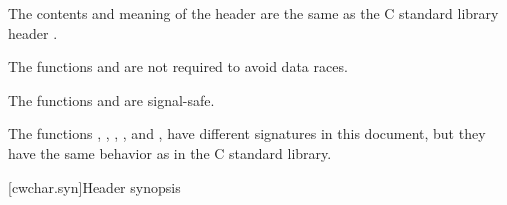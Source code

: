 \pnum
{}%
The contents and meaning of the header 
are the same as the C standard library header .

\pnum
The functions  and  are not required to avoid data
races.

\pnum
{}%
%
The functions  and  are signal-safe.

\pnum
\begin{note}
The functions
, , , , and ,
have different signatures in this document,
but they have the same behavior as in the C standard library.
\end{note}


[cwchar.syn]{Header  synopsis}


